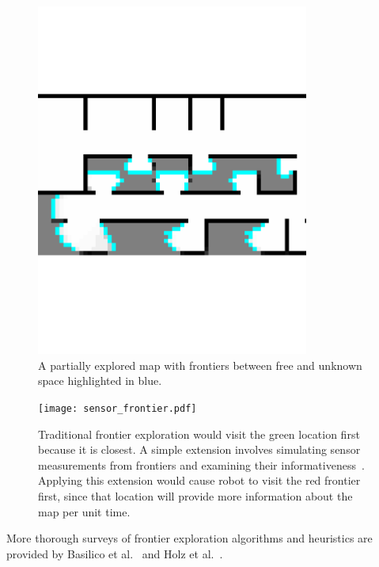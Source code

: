 \begin{figure}[t]
  \centering
  \includegraphics[trim=0cm 0.4cm 0.1cm 0.1cm, clip, width=0.8\textwidth]{frontiers.pdf}
  \caption[Frontiers in a partially explored map.]{A partially explored map with frontiers between free and unknown
  space highlighted in blue.\label{fig:frontiers}}
\end{figure}


\begin{figure}[t]
  \centering
  \centering
  \texttt{[image: sensor\_frontier.pdf]}
  \caption[Effects of modeling sensors on frontier exploration.]{Traditional frontier exploration would visit the green location first
    because it is closest. A simple extension involves simulating sensor
    measurements from frontiers and examining their informativeness~\cite{gonzalez2002navigation}. Applying this
    extension would cause robot to visit the red frontier first, since that
    location will provide more information about the map per unit time.\label{fig:sensor_frontier}}
\end{figure}

More thorough surveys of frontier exploration algorithms and heuristics are provided by
Basilico et al.~\cite{basilico2008evaluating} and Holz et al.~\cite{holz2011comparative}.

